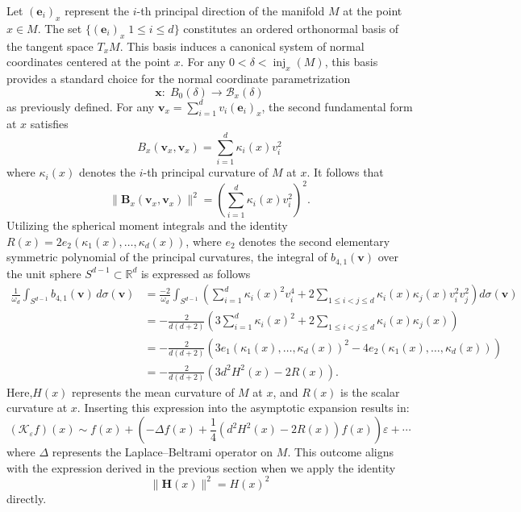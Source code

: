 \documentclass{amsart}
\theoremstyle{Theorem}
\theoremstyle{remark}
\numberwithin{equation}{section} \numberwithin{figure}{section}
\renewcommand*{\to}{\rightarrow}
\begin{document}
Let \( (\mathbf{e}_i)_x \) represent the \( i \)-th principal direction of the manifold \( M \) at the point \( x \in M \). The set \( \{ (\mathbf{e}_i)_x \; 1 \leq i \leq d \} \) constitutes an ordered orthonormal basis of the tangent space \( T_x M \). This basis induces a canonical system of normal coordinates centered at the point \( x \). For any \( 0 < \delta < \operatorname{inj}_x(M) \), this basis provides a standard choice for the normal coordinate parametrization
\[
\mathbf{x} :\; B_0(\delta) \to \mathcal{B}_x(\delta)
\]
as previously defined. For any \( \mathbf{v}_{x} = \sum_{i=1}^{d} v_i (\mathbf{e}_i)_x \), the second fundamental form at \( x \) satisfies
\[
B_x(\mathbf{v}_{x}, \mathbf{v}_{x}) = \sum_{i=1}^{d} \kappa_i(x) v_i^2
\]
where \( \kappa_i(x) \) denotes the \( i \)-th principal curvature of \( M \) at \( x \). It follows that
\[
\| \mathbf{B}_x(\mathbf{v}_{x}, \mathbf{v}_{x}) \|^2 = \left( \sum_{i=1}^{d} \kappa_i(x) v_i^2 \right)^2.
\]
Utilizing the spherical moment integrals and the identity \( R(x) = 2 e_2(\kappa_1(x), \dots, \kappa_d(x)) \), where \( e_2 \) denotes the second elementary symmetric polynomial of the principal curvatures, the integral of \( b_{4,1}(\mathbf{v}) \) over the unit sphere \( S^{d-1} \subset \mathbb{R}^d \) is expressed as follows
\begin{align*}
\frac{1}{\omega_d} \int_{S^{d-1}} b_{4,1}(\mathbf{v}) \, d\sigma(\mathbf{v})
&= \frac{-2}{\omega_d} \int_{S^{d-1}} \left( \sum_{i=1}^d \kappa_i(x)^2 v_i^4 + 2 \sum_{1 \leq i < j \leq d} \kappa_i(x) \kappa_j(x) v_i^2 v_j^2 \right) d\sigma(\mathbf{v}) \\
&= -\frac{2}{d(d+2)} \left( 3 \sum_{i=1}^d \kappa_i(x)^2 + 2 \sum_{1 \leq i < j \leq d} \kappa_i(x) \kappa_j(x) \right) \\
&= -\frac{2}{d(d+2)} \left( 3 e_1(\kappa_1(x), \dots, \kappa_d(x))^2 - 4 e_2(\kappa_1(x), \dots, \kappa_d(x)) \right) \\
&= -\frac{2}{d(d+2)} \left( 3 d^2 H^2(x) - 2 R(x) \right).
\end{align*}
Here,\( H(x) \) represents the mean curvature of \( M \) at \( x \), and \( R(x) \) is the scalar curvature at \( x \).
Inserting this expression into the asymptotic expansion results in:
\[
(\mathcal{K}_\varepsilon f)(x) \sim f(x) + \left( -\Delta f(x) + \frac{1}{4} \left( d^2 H^2(x) - 2 R(x) \right) f(x) \right) \varepsilon + \cdots
\]
where \( \Delta \) represents the Laplace–Beltrami operator on \( M \). This outcome aligns with the expression derived in the previous section when we apply the identity \[ \| \mathbf{H}(x) \|^2 = H(x)^2 \] directly.
\end{document}

